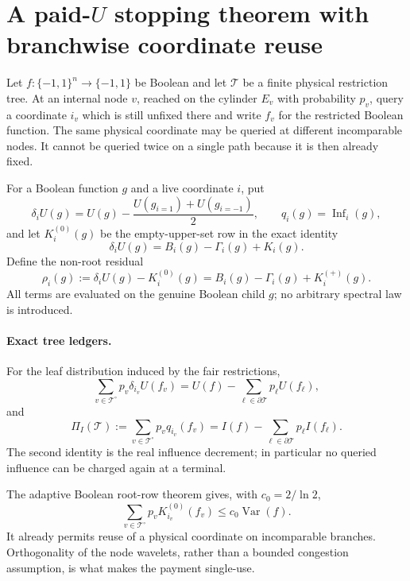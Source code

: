 \section*{A paid-$U$ stopping theorem with branchwise coordinate reuse}

Let $f:\{-1,1\}^n\to\{-1,1\}$ be Boolean and let $\mathcal T$ be a
finite physical restriction tree.  At an internal node $v$, reached on the
cylinder $E_v$ with probability $p_v$, query a coordinate $i_v$ which is
still unfixed there and write $f_v$ for the restricted Boolean function.
The same physical coordinate may be queried at different incomparable
nodes.  It cannot be queried twice on a single path because it is then
already fixed.

For a Boolean function $g$ and a live coordinate $i$, put
\[
 \delta_iU(g)=U(g)-\frac{U(g_{i=1})+U(g_{i=-1})}{2},\qquad
 q_i(g)=\operatorname{Inf}_i(g),
\]
and let $K_i^{(0)}(g)$ be the empty-upper-set row in the exact identity
\[
 \delta_iU(g)=B_i(g)-\Gamma_i(g)+K_i(g).
\]
Define the non-root residual
\[
 \rho_i(g):=\delta_iU(g)-K_i^{(0)}(g)
 =B_i(g)-\Gamma_i(g)+K_i^{(+)}(g).                 \tag{1}
\]
All terms are evaluated on the genuine Boolean child $g$; no arbitrary
spectral law is introduced.

\paragraph{Exact tree ledgers.}
For the leaf distribution induced by the fair restrictions,
\[
 \sum_{v\in\mathcal T^\circ}p_v\delta_{i_v}U(f_v)
   =U(f)-\sum_{\ell\in\partial\mathcal T}p_\ell U(f_\ell),               \tag{2}
\]
and
\[
 \Pi_I(\mathcal T):=\sum_{v\in\mathcal T^\circ}p_v q_{i_v}(f_v)
   =I(f)-\sum_{\ell\in\partial\mathcal T}p_\ell I(f_\ell).             \tag{3}
\]
The second identity is the real influence decrement; in particular no
queried influence can be charged again at a terminal.

The adaptive Boolean root-row theorem gives, with $c_0=2/\ln2$,
\[
 \sum_{v\in\mathcal T^\circ}p_vK_{i_v}^{(0)}(f_v)
 \le c_0\operatorname{Var}(f).                                         \tag{4}
\]
It already permits reuse of a physical coordinate on incomparable
branches.  Orthogonality of the node wavelets, rather than a bounded
congestion assumption, is what makes the payment single-use.

